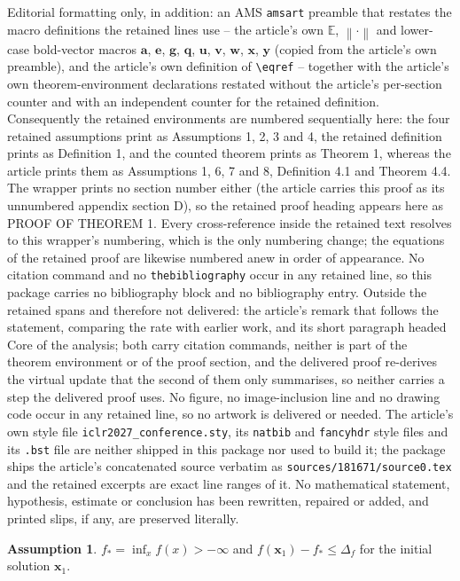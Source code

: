 \documentclass[10pt,a4paper]{amsart}
\theoremstyle{plain}
\theoremstyle{definition}
\newtheorem{ass}{Assumption}
\def \E {\mathbb{E}}
\newcommand{\Norm}[1]{\left\|#1\right\|}
\def \a {\mathbf{a}}
\def \e {\mathbf{e}}
\def \g {\mathbf{g}}
\def \q {\mathbf{q}}
\def \u {\mathbf{u}}
\def \v {\mathbf{v}}
\def \w {\mathbf{w}}
\def \x {\mathbf{x}}
\def \y {\mathbf{y}}
\begin{document}
Editorial formatting only, in addition: an AMS \texttt{amsart} preamble that restates the macro definitions the retained lines use -- the article's own $\E$, $\Norm{\cdot}$ and lower-case bold-vector macros $\a$, $\e$, $\g$, $\q$, $\u$, $\v$, $\w$, $\x$, $\y$ (copied from the article's own preamble), and the article's own definition of \texttt{\textbackslash eqref} -- together with the article's own theorem-environment declarations restated without the article's per-section counter and with an independent counter for the retained definition. Consequently the retained environments are numbered sequentially here: the four retained assumptions print as Assumptions 1, 2, 3 and 4, the retained definition prints as Definition 1, and the counted theorem prints as Theorem 1, whereas the article prints them as Assumptions 1, 6, 7 and 8, Definition 4.1 and Theorem 4.4. The wrapper prints no section number either (the article carries this proof as its unnumbered appendix section D), so the retained proof heading appears here as PROOF OF THEOREM 1. Every cross-reference inside the retained text resolves to this wrapper's numbering, which is the only numbering change; the equations of the retained proof are likewise numbered anew in order of appearance. No citation command and no \texttt{thebibliography} occur in any retained line, so this package carries no bibliography block and no bibliography entry. Outside the retained spans and therefore not delivered: the article's remark that follows the statement, comparing the rate with earlier work, and its short paragraph headed Core of the analysis; both carry citation commands, neither is part of the theorem environment or of the proof section, and the delivered proof re-derives the virtual update that the second of them only summarises, so neither carries a step the delivered proof uses. No figure, no image-inclusion line and no drawing code occur in any retained line, so no artwork is delivered or needed. The article's own style file \texttt{iclr2027\_conference.sty}, its \texttt{natbib} and \texttt{fancyhdr} style files and its \texttt{.bst} file are neither shipped in this package nor used to build it; the package ships the article's concatenated source verbatim as \texttt{sources/181671/source0.tex} and the retained excerpts are exact line ranges of it. No mathematical statement, hypothesis, estimate or conclusion has been rewritten, repaired or added, and printed slips, if any, are preserved literally.
\begin{ass}\label{ass:below} $f_{*}=\inf_x f(x) > -\infty$ and $f(\x_1) - f_{*} \leq \Delta_f$ for the initial solution $\x_1$.
\end{ass}
\end{document}
